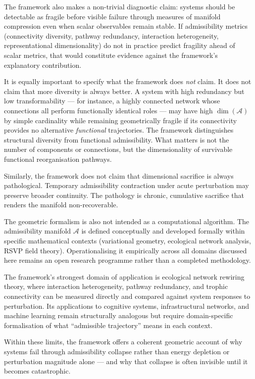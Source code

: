 \documentclass[11pt,a4paper]{article}
\newcommand{\Aspace}{\mathcal{A}}
\begin{document}
The framework also makes a non-trivial diagnostic claim: systems should be detectable as fragile before visible failure through measures of manifold compression even when scalar observables remain stable. If admissibility metrics (connectivity diversity, pathway redundancy, interaction heterogeneity, representational dimensionality) do not in practice predict fragility ahead of scalar metrics, that would constitute evidence against the framework's explanatory contribution.

It is equally important to specify what the framework does \emph{not} claim. It does not claim that more diversity is always better. A system with high redundancy but low transformability --- for instance, a highly connected network whose connections all perform functionally identical roles --- may have high $\dim(\Aspace)$ by simple cardinality while remaining geometrically fragile if its connectivity provides no alternative \emph{functional} trajectories. The framework distinguishes structural diversity from functional admissibility. What matters is not the number of components or connections, but the dimensionality of survivable functional reorganisation pathways.

Similarly, the framework does not claim that dimensional sacrifice is always pathological. Temporary admissibility contraction under acute perturbation may preserve broader continuity. The pathology is chronic, cumulative sacrifice that renders the manifold non-recoverable.

The geometric formalism is also not intended as a computational algorithm. The admissibility manifold $\Aspace$ is defined conceptually and developed formally within specific mathematical contexts (variational geometry, ecological network analysis, RSVP field theory). Operationalising it empirically across all domains discussed here remains an open research programme rather than a completed methodology.

The framework's strongest domain of application is ecological network rewiring theory, where interaction heterogeneity, pathway redundancy, and trophic connectivity can be measured directly and compared against system responses to perturbation. Its applications to cognitive systems, infrastructural networks, and machine learning remain structurally analogous but require domain-specific formalisation of what ``admissible trajectory'' means in each context.

Within these limits, the framework offers a coherent geometric account of why systems fail through admissibility collapse rather than energy depletion or perturbation magnitude alone --- and why that collapse is often invisible until it becomes catastrophic.
\end{document}
